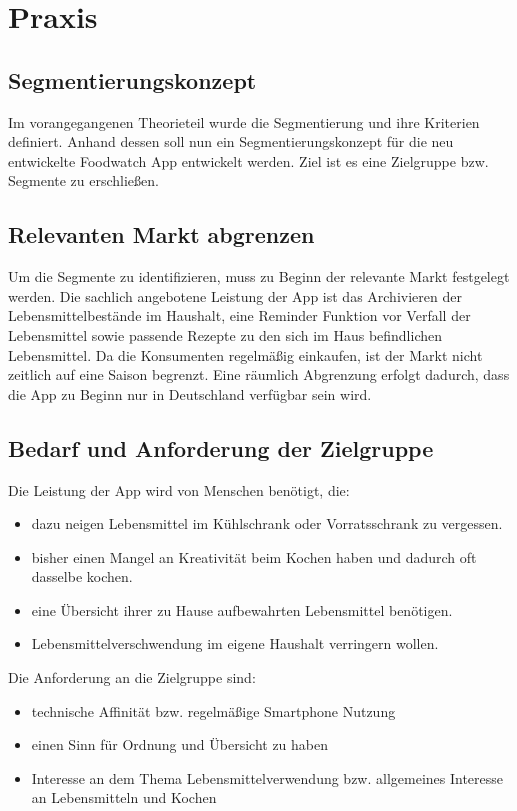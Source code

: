 \newpage
\section{Praxis}

\subsection{Segmentierungskonzept}
Im vorangegangenen Theorieteil wurde die Segmentierung und ihre Kriterien definiert. Anhand dessen soll nun ein Segmentierungskonzept für die neu entwickelte Foodwatch App entwickelt werden. Ziel ist es eine Zielgruppe bzw. Segmente zu erschließen.

\subsection{Relevanten Markt abgrenzen}
Um die Segmente zu identifizieren, muss zu Beginn der relevante Markt festgelegt werden. Die sachlich angebotene Leistung der App ist das Archivieren der Lebensmittelbestände im Haushalt, eine Reminder Funktion vor Verfall der Lebensmittel sowie passende Rezepte zu den sich im Haus befindlichen Lebensmittel. Da die Konsumenten regelmäßig einkaufen, ist der Markt nicht zeitlich auf eine Saison begrenzt. Eine räumlich Abgrenzung erfolgt dadurch, dass die App zu Beginn nur in Deutschland verfügbar sein wird.

\subsection{Bedarf und Anforderung der Zielgruppe}
Die Leistung der App wird von Menschen benötigt, die:

\begin{itemize}
\item dazu neigen Lebensmittel im Kühlschrank oder Vorratsschrank zu vergessen.
\item bisher einen Mangel an Kreativität beim Kochen haben und dadurch oft dasselbe kochen.
\item eine Übersicht ihrer zu Hause aufbewahrten Lebensmittel benötigen.
\item Lebensmittelverschwendung im eigene Haushalt verringern wollen.
\end{itemize}

Die Anforderung an die Zielgruppe sind:
\begin{itemize}
\item technische Affinität bzw. regelmäßige Smartphone Nutzung
\item einen Sinn für Ordnung und Übersicht zu haben
\item Interesse an dem Thema Lebensmittelverwendung bzw. allgemeines Interesse an Lebensmitteln und Kochen \end{itemize}

